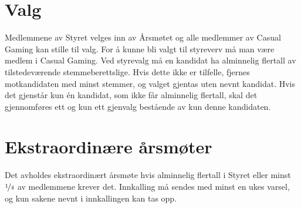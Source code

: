 \section{Valg}
Medlemmene av Styret velges inn av Årsmøtet og alle medlemmer av Casual Gaming kan stille til valg. For å kunne bli valgt til styreverv må man være medlem i Casual Gaming. Ved styrevalg må en kandidat ha alminnelig flertall av tilstedeværende stemmeberettslige. Hvis dette ikke er tilfelle, fjernes motkandidaten med minst stemmer, og valget gjentas uten nevnt kandidat. Hvis det gjenstår kun én kandidat, som ikke får alminnelig flertall, skal det gjennomføres ett og kun ett gjenvalg bestående av kun denne kandidaten.

\section{Ekstraordinære årsmøter}
Det avholdes ekstraordinært årsmøte hvis alminnelig flertall i Styret eller minst $\nicefrac{1}{4}$ av medlemmene krever det. Innkalling må sendes med minst en ukes varsel, og kun sakene nevnt i innkallingen kan tas opp.
